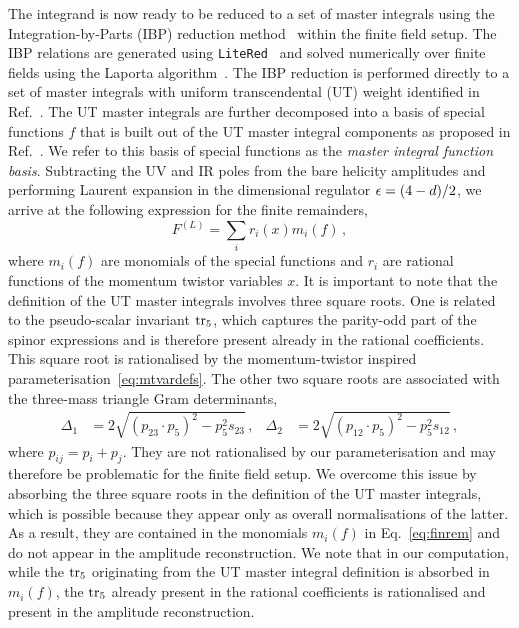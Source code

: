 \documentclass[main.tex]{subfiles}
\begin{document}
The integrand is now ready to be reduced to a set of master integrals using the Integration-by-Parts (IBP) reduction method~\cite{Chetyrkin:1981qh} within the finite field setup. The IBP relations are generated using \texttt{LiteRed}~\cite{Lee:2012cn} and solved numerically over finite fields using the Laporta algorithm~\cite{Laporta:2001dd}. The IBP reduction is performed directly to a set of master integrals with uniform transcendental (UT) weight identified in Ref.~\cite{Abreu:2020jxa}. The UT master integrals are further decomposed into a basis of special functions $f$ that is built out of the UT master integral components as proposed in Ref.~\cite{Badger:2021nhg}. We refer to this basis of special functions as the \textit{master integral function basis}.
Subtracting the UV and IR poles from the bare helicity amplitudes and performing Laurent expansion in the dimensional regulator $\epsilon = (4-d)/2$, we arrive at the following expression for the finite remainders,
\begin{equation}
F^{(L)} = \sum_{i} r_i(x) m_i(f)\,,
\label{eq:finrem}
\end{equation}
where $m_i(f)$ are monomials of the special functions and $r_i$ are rational functions of the momentum twistor variables $x$. It is important to note that the definition of the UT master integrals involves three square roots. One is related to the pseudo-scalar invariant $\operatorname{\rm tr}_5$, which captures the parity-odd part of the spinor expressions and is therefore present already in the rational coefficients. This square root is rationalised by the momentum-twistor inspired parameterisation~\eqref{eq:mtvardefs}. The other two square roots are associated with the three-mass triangle Gram determinants,
\begin{align}
  \Delta_1 &= 2 \sqrt{(p_{23} \cdot p_{5})^2 - p_5^2 s_{23}} \,,&
  \Delta_2 &= 2 \sqrt{(p_{12} \cdot p_{5})^2 - p_5^2 s_{12}} \,,
  \label{eq:squareroots}
\end{align}
where $p_{ij} = p_i + p_j$.
They are not rationalised by our parameterisation and may therefore be problematic for the finite field setup. We overcome this issue by absorbing the three square roots in the definition of the UT master integrals, which is possible because they appear only as overall normalisations of the latter. As a result, they are contained in the monomials $m_i(f)$ in Eq.~\eqref{eq:finrem} and do not appear in the amplitude reconstruction.
 We note that in our computation, while the $\operatorname{\rm tr}_5$ originating from the UT master integral definition is absorbed in $m_i(f)$, 
the $\operatorname{\rm tr}_5$ already present in the rational coefficients is rationalised and present in the amplitude reconstruction.
\end{document}
